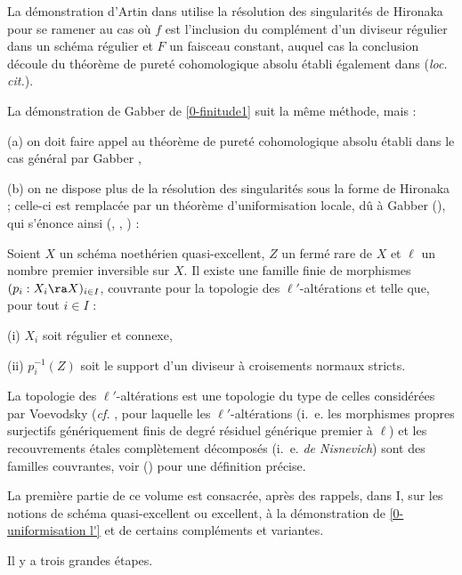 \documentclass[10pt]{../fichiers-configuration-latex/smfart}
\begin{document}
La démonstration d'Artin dans  utilise la résolution des singularités de Hironaka pour
se ramener au cas où $f$ est l'inclusion du complément d'un diviseur régulier dans un schéma
régulier et $F$ un faisceau constant, auquel cas la conclusion découle du théorème de pureté
cohomologique absolu établi également dans (\textit{loc. cit.}). 

La démonstration de Gabber de \ref{0-finitude1} suit la même méthode, mais :

(a) on doit faire appel au théorème de pureté cohomologique absolu établi dans le cas général par
Gabber \cite{AZUMINO@Fujiwara}, 

(b) on ne dispose plus de la résolution des singularités sous la forme de Hironaka ; celle-ci est
remplacée par un théorème d'uniformisation locale, dû à Gabber (\cite{Conference-Deligne@Gabber}),
qui s'énonce ainsi (, ,
) : \begin{theoreme}\label{0-uniformisation l'} Soient $X$ un schéma noethérien
quasi-excellent, $Z$ un fermé rare de $X$ et $\ell$ un nombre premier inversible sur $X$. Il existe
une famille finie de morphismes $(p_i : X_i \ra X)_{i \in I}$, couvrante pour la topologie des
$\ell'$-altérations et telle que, pour tout $i \in I$ :

(i) $X_i$ soit régulier et connexe,

(ii) $p_i^{-1}(Z)$ soit le support d'un diviseur à croisements normaux stricts.  \end{theoreme} La
topologie des $\ell'$-altérations est une topologie du type de celles considérées par Voevodsky
(\textit{cf.} \cite{Cohomological@Goodwillie-Lichtenbaum}, pour laquelle les $\ell'$-altérations
(i.~e. les morphismes propres surjectifs génériquement finis de degré résiduel générique premier à
$\ell$) et les recouvrements étales complètement décomposés (i.~e.  \textit{de Nisnevich}) sont des
familles couvrantes, voir () pour une définition précise.

La première partie de ce volume est consacrée, après des rappels, dans I, sur les notions de schéma
quasi-excellent ou excellent, à la démonstration de \ref{0-uniformisation l'} et de certains
compléments et variantes. 

Il y a trois grandes étapes.
\end{document}
